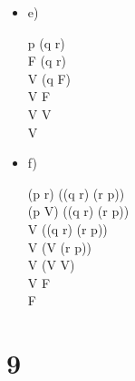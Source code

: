 \documentclass[12pt, fleqn]{article}                            %
\def \Eq {equation}                                             %
\newenvironment{MultiLineEquation*}[1]                          %
        {\begin{\Eq*}\begin{alignedat}{#1}}                         %
        {\end{alignedat}\end{\Eq*}}                                 %
\theoremstyle{break}                                            %
\begin{document}
\begin{multicols}{2}
\begin{itemize}
        \item e)
            \begin{MultiLineEquation*}{3}
                \neg p \vee \neg (q \wedge r)                \\
                \neg F \vee \neg (q \wedge r)                \\
                V \vee \neg (q \wedge F)                \\
                V \vee \neg F                \\
                V \vee V                \\
                V
            \end{MultiLineEquation*}


        \item f)
            \begin{MultiLineEquation*}{3}
                (p \vee \neg r) \wedge \neg((q \vee r) \wedge \neg(r \vee p))  \\
                (p \vee V) \wedge \neg((q \vee r) \wedge \neg(r \vee p))        \\
                V \wedge \neg((q \vee r) \wedge \neg(r \vee p))                 \\
                V \wedge \neg(V \wedge \neg(r \vee p))                          \\
                V \wedge \neg(V \vee V)                                       \\
                V \wedge F                                                      \\
                F
            \end{MultiLineEquation*}
                    

    \end{itemize}

\end{multicols}



\clearpage
\section{9}
\end{document}
